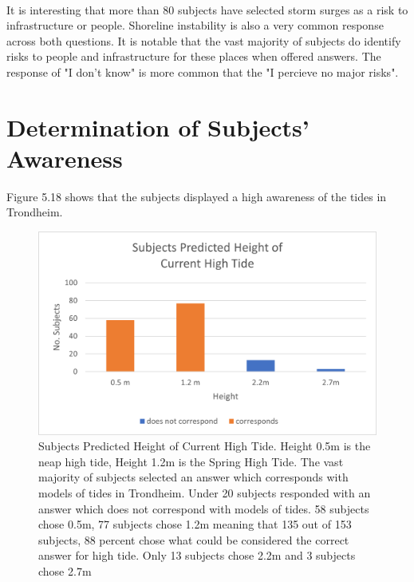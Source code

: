 \paragraph{}
It is interesting that more than 80 subjects have selected storm surges as a risk to infrastructure or people. Shoreline instability is also a very common response across both questions. It is notable that the vast majority of subjects do identify risks to people and infrastructure for these places when offered answers. The response of "I don't know" is more common that the "I percieve no major risks". 


\section{Determination of Subjects' Awareness}
Figure 5.18 shows that the subjects displayed a high awareness of the tides in Trondheim. 

\begin{figure}[H]
    \centering
    \includegraphics{fig_results/2022-hightide-answers.png}
    \caption{Subjects Predicted Height of Current High Tide. Height 0.5m is the neap high tide, Height 1.2m is the Spring High Tide. The vast majority of subjects selected an answer which corresponds with models of tides in Trondheim. Under 20 subjects responded with an answer which does not correspond with models of tides. 58 subjects chose 0.5m, 77 subjects chose 1.2m meaning that 135 out of 153 subjects, 88 percent chose what could be considered the correct answer for high tide. Only 13 subjects chose 2.2m and 3 subjects chose 2.7m}
    \label{fig:high-tide-answer}
\end{figure}
\paragraph{}

